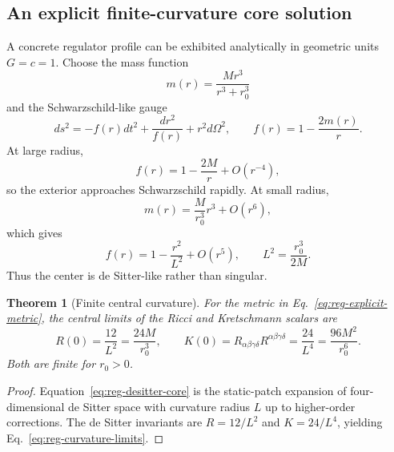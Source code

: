 \documentclass[11pt]{article}
\newtheorem{theorem}{Theorem}
\theoremstyle{remark}
\begin{document}
\subsection{An explicit finite-curvature core solution}
A concrete regulator profile can be exhibited analytically in geometric units $G=c=1$. Choose the mass function
\begin{equation}
 m(r)=\frac{Mr^3}{r^3+r_0^3}
 \label{eq:reg-mass-profile}
\end{equation}
and the Schwarzschild-like gauge
\begin{equation}
 ds^2=-f(r)dt^2+\frac{dr^2}{f(r)}+r^2d\Omega^2,
 \qquad
 f(r)=1-\frac{2m(r)}{r}.
 \label{eq:reg-explicit-metric}
\end{equation}
At large radius,
\begin{equation}
 f(r)=1-\frac{2M}{r}+O(r^{-4}),
\end{equation}
so the exterior approaches Schwarzschild rapidly. At small radius,
\begin{equation}
 m(r)=\frac{M}{r_0^3}r^3+O(r^6),
\end{equation}
which gives
\begin{equation}
 f(r)=1-\frac{r^2}{L^2}+O(r^5),
 \qquad
 L^2=\frac{r_0^3}{2M}.
 \label{eq:reg-desitter-core}
\end{equation}
Thus the center is de Sitter-like rather than singular.

\begin{theorem}[Finite central curvature]
For the metric in Eq.~\eqref{eq:reg-explicit-metric}, the central limits of the Ricci and Kretschmann scalars are
\begin{equation}
 R(0)=\frac{12}{L^2}=\frac{24M}{r_0^3},
 \qquad
 K(0)=R_{\alpha\beta\gamma\delta}R^{\alpha\beta\gamma\delta}
 =\frac{24}{L^4}=\frac{96M^2}{r_0^6}.
 \label{eq:reg-curvature-limits}
\end{equation}
Both are finite for $r_0>0$.
\end{theorem}

\begin{proof}
Equation~\eqref{eq:reg-desitter-core} is the static-patch expansion of four-dimensional de Sitter space with curvature radius $L$ up to higher-order corrections. The de Sitter invariants are $R=12/L^2$ and $K=24/L^4$, yielding Eq.~\eqref{eq:reg-curvature-limits}.
\end{proof}
\end{document}
